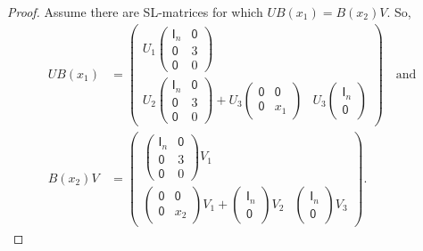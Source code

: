 \documentclass[12pt]{amsbook}%
\theoremstyle{defin}
\theoremstyle{remark}
\numberwithin{equation}{chapter}
\numberwithin{theor}{section}
\newcommand{\idmatrix}{\mathsf{I}}
\newcommand{\zmatrix}{\mathsf{0}}
\newcommand{\SL}{{\sf SL}}
\begin{document}
\begin{proof}
Assume there are \SL-matrices for which $U B(x_1) = B(x_2) V$.  So, 
\begin{align*}
UB(x_1) &= \left(\begin{array}{c|c}
U_1 \left( \begin{smallmatrix} \idmatrix_n & \zmatrix \\ \zmatrix & 3 \\ \zmatrix & 0 \end{smallmatrix} \right) & \\ \hline
U_2 \left( \begin{smallmatrix} \idmatrix_n & \zmatrix \\ \zmatrix& 3 \\ \zmatrix & 0 \end{smallmatrix} \right)  + U_3 \left( \begin{smallmatrix} \zmatrix & \zmatrix \\ \zmatrix  & x_1 \end{smallmatrix} \right)  & U_3 \left( \begin{smallmatrix} \idmatrix_n  \\ \zmatrix  \end{smallmatrix} \right)  \end{array} \right) \quad \text{and} \\
B(x_2) V &= \left(\begin{array}{c|c}
\left( \begin{smallmatrix} \idmatrix_n & \zmatrix \\ \zmatrix & 3 \\ \zmatrix & 0 \end{smallmatrix} \right) V_1 & \\ \hline
\left( \begin{smallmatrix} \zmatrix & \zmatrix \\ \zmatrix  & x_2 \end{smallmatrix} \right) V_1 
+ \left( \begin{smallmatrix} \idmatrix_n  \\ \zmatrix \end{smallmatrix} \right) V_2  & \left( \begin{smallmatrix} \idmatrix_n  \\ \zmatrix \end{smallmatrix} \right) V_3
\end{array}
\right).
\end{align*}

\end{proof}
\end{document}
